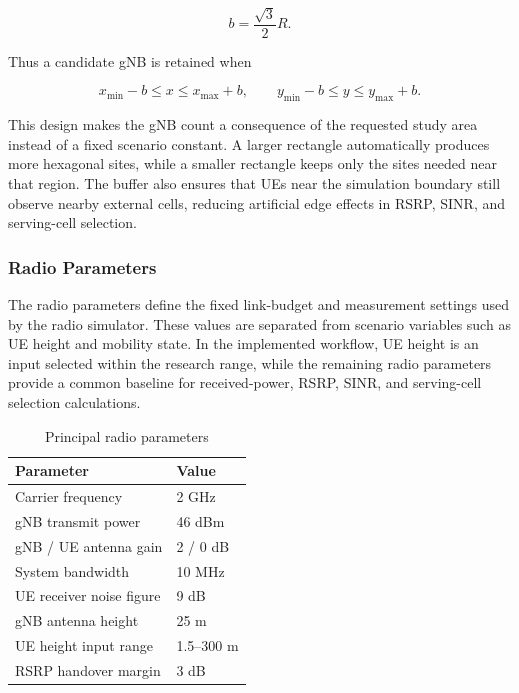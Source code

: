\begin{equation}
    b=\frac{\sqrt{3}}{2}R.
\end{equation}

Thus a candidate gNB is retained when

\begin{equation}
    x_{\min}-b \le x \le x_{\max}+b,
    \qquad
    y_{\min}-b \le y \le y_{\max}+b.
\end{equation}

This design makes the gNB count a consequence of the requested study area instead of a fixed scenario constant. A larger rectangle automatically produces more hexagonal sites, while a smaller rectangle keeps only the sites needed near that region. The buffer also ensures that UEs near the simulation boundary still observe nearby external cells, reducing artificial edge effects in RSRP, SINR, and serving-cell selection.

\subsubsection{Radio Parameters}

The radio parameters define the fixed link-budget and measurement settings used
by the radio simulator. These values are separated from scenario variables such
as UE height and mobility state. In the implemented workflow, UE height is an
input selected within the research range, while the remaining radio parameters
provide a common baseline for received-power, RSRP, SINR, and serving-cell
selection calculations.

\begin{table}[H]
\centering
\caption[Principal radio parameters]{Principal radio parameters \cite{3gpp_38901,3gpp_36777,3gpp_36104,3gpp_36101}}
\begin{tabular}{ll}
\toprule
Parameter & Value\\
\midrule
Carrier frequency & 2 GHz\\
gNB transmit power & 46 dBm\\
gNB / UE antenna gain & 2 / 0 dB\\
System bandwidth & 10 MHz\\
UE receiver noise figure & 9 dB\\
gNB antenna height & 25 m\\
UE height input range & 1.5--300 m\\
RSRP handover margin & 3 dB\\
\bottomrule
\end{tabular}
\label{tab:principal-radio-parameters}
\end{table}

